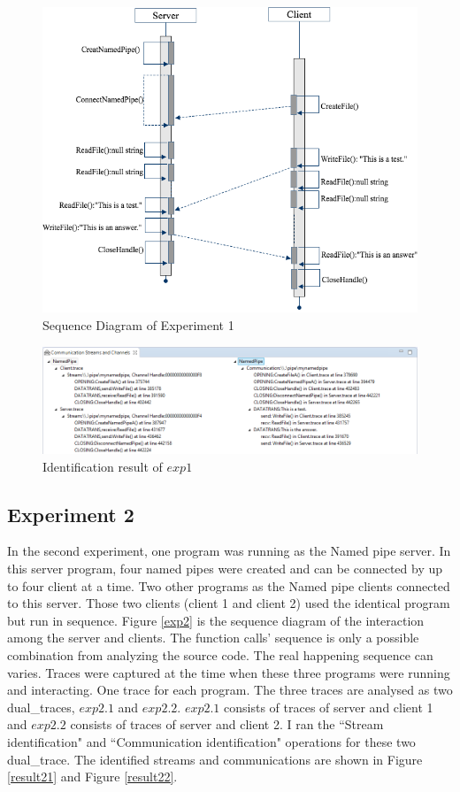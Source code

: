 \begin{figure}[H]
\centerline{\includegraphics[scale=0.7]{Figures/exp1}}
 \caption{Sequence Diagram of Experiment 1}
\label{exp1}
\end{figure}

\begin{figure}[H]
\centerline{\includegraphics[scale=0.65]{Figures/result1}}
 \caption{Identification result of $exp1$}
\label{result1}
\end{figure}

\subsection{Experiment 2}
In the second experiment, one program was running as the Named pipe server. In this server program, four named pipes were created and can be connected by up to four client at a time. Two other programs as the Named pipe clients connected to this server. Those two clients (client 1 and client 2) used the identical program but run in sequence. Figure \ref{exp2} is the sequence diagram of the interaction among the server and clients. The function calls' sequence is only a possible combination from analyzing the source code. The real happening sequence can varies. Traces were captured at the time when these three programs were running and interacting. One trace for each program. The three traces are analysed as two dual\_traces, $exp2.1$ and $exp2.2$. $exp2.1$ consists of traces of server and client 1 and $exp2.2$ consists of traces of server and client 2. I ran the ``Stream identification" and ``Communication identification" operations for these two dual\_trace. The identified streams and communications are shown in Figure \ref{result21} and Figure \ref{result22}.

